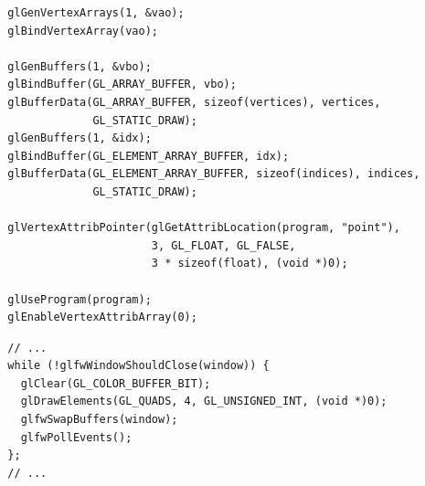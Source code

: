 \documentclass[calcdimensions,landscape,letterpaper]{powersem}
\newcommand{\thecurrentheading}{}
\newcommand{\heading}[1]{\renewcommand{\thecurrentheading}{#1}}
\begin{document}
\begin{slide}
    \heading{Pipeline Input: Vertex Array Object}
    \begin{center}
        \begin{minipage}[c]{.95\textwidth}
            \begin{verbatim}
  glGenVertexArrays(1, &vao);
  glBindVertexArray(vao);

  glGenBuffers(1, &vbo);
  glBindBuffer(GL_ARRAY_BUFFER, vbo);
  glBufferData(GL_ARRAY_BUFFER, sizeof(vertices), vertices,
               GL_STATIC_DRAW);
  glGenBuffers(1, &idx);
  glBindBuffer(GL_ELEMENT_ARRAY_BUFFER, idx);
  glBufferData(GL_ELEMENT_ARRAY_BUFFER, sizeof(indices), indices,
               GL_STATIC_DRAW);

  glVertexAttribPointer(glGetAttribLocation(program, "point"),
                        3, GL_FLOAT, GL_FALSE,
                        3 * sizeof(float), (void *)0);

  glUseProgram(program);
  glEnableVertexAttribArray(0);
            \end{verbatim}
        \end{minipage}
    \end{center}
\end{slide}

\begin{slide}
    \heading{Pipeline Input: Render Quads}
    \begin{center}
        \begin{minipage}[c]{.95\textwidth}
            \begin{verbatim}
  // ...
  while (!glfwWindowShouldClose(window)) {
    glClear(GL_COLOR_BUFFER_BIT);
    glDrawElements(GL_QUADS, 4, GL_UNSIGNED_INT, (void *)0);
    glfwSwapBuffers(window);
    glfwPollEvents();
  };
  // ...
            \end{verbatim}
        \end{minipage}
    \end{center}
\end{slide}
\end{document}
